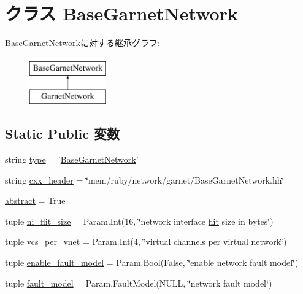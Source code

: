 \hypertarget{classBaseGarnetNetwork_1_1BaseGarnetNetwork}{
\section{クラス BaseGarnetNetwork}
\label{classBaseGarnetNetwork_1_1BaseGarnetNetwork}
}
BaseGarnetNetworkに対する継承グラフ:\begin{figure}[H]
\begin{center}
\leavevmode
\includegraphics[height=2cm]{classBaseGarnetNetwork_1_1BaseGarnetNetwork}
\end{center}
\end{figure}
\subsection*{Static Public 変数}
\begin{DoxyCompactItemize}
\item 
string \hyperlink{classBaseGarnetNetwork_1_1BaseGarnetNetwork_acce15679d830831b0bbe8ebc2a60b2ca}{type} = '\hyperlink{classBaseGarnetNetwork_1_1BaseGarnetNetwork}{BaseGarnetNetwork}'
\item 
string \hyperlink{classBaseGarnetNetwork_1_1BaseGarnetNetwork_a17da7064bc5c518791f0c891eff05fda}{cxx\_\-header} = \char`\"{}mem/ruby/network/garnet/BaseGarnetNetwork.hh\char`\"{}
\item 
\hyperlink{classBaseGarnetNetwork_1_1BaseGarnetNetwork_a17fa61ac3806b481cafee5593b55e5d0}{abstract} = True
\item 
tuple \hyperlink{classBaseGarnetNetwork_1_1BaseGarnetNetwork_a0b76d8599630f795ff97703fe84ff7d9}{ni\_\-flit\_\-size} = Param.Int(16, \char`\"{}network interface \hyperlink{classflit}{flit} size in bytes\char`\"{})
\item 
tuple \hyperlink{classBaseGarnetNetwork_1_1BaseGarnetNetwork_a2bb2221cda9b94b6a0c2944d8a12f31e}{vcs\_\-per\_\-vnet} = Param.Int(4, \char`\"{}virtual channels per virtual network\char`\"{})
\item 
tuple \hyperlink{classBaseGarnetNetwork_1_1BaseGarnetNetwork_acad5e3407be72b05938ce07227ebd49c}{enable\_\-fault\_\-model} = Param.Bool(False, \char`\"{}enable network fault model\char`\"{})
\item 
tuple \hyperlink{classBaseGarnetNetwork_1_1BaseGarnetNetwork_a4d201916fdd647cf79775edd2612adce}{fault\_\-model} = Param.FaultModel(NULL, \char`\"{}network fault model\char`\"{})
\end{DoxyCompactItemize}


